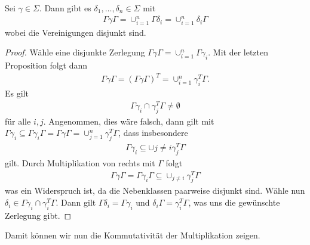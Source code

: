 
\begin{prop}
Sei $\gamma \in \Sigma$.
Dann gibt es $\delta_1,\dots,\delta_n\in \Sigma$ mit
\begin{align*}
\Gamma \gamma \Gamma =\cup_{i=1}^n \Gamma \delta_i=\cup_{i=1}^n \delta_i \Gamma
\end{align*}
wobei die Vereinigungen disjunkt sind.
\end{prop}
\begin{proof}
Wähle eine disjunkte Zerlegung $\Gamma \gamma \Gamma = \cup_{i=1}^n \Gamma \gamma_i$.
Mit der letzten Proposition folgt dann
\begin{align*}
\Gamma \gamma \Gamma=\left(\Gamma \gamma \Gamma\right)^T=\cup_{i=1}^n \gamma_i^T \Gamma.
\end{align*}
Es gilt
\begin{align*}
\Gamma \gamma_i \cap \gamma_j^T \Gamma \not =\emptyset
\end{align*}
für alle $i,j$.
Angenommen, dies wäre falsch, dann gilt mit $\Gamma \gamma_i \subseteq \Gamma \gamma_i \Gamma=\Gamma \gamma \Gamma=\cup_{j=1}^n \gamma_j^T \Gamma$, dass insbesondere
\begin{align*}
\Gamma \gamma_i \subseteq \cup{j\not =i} \gamma_j^T \Gamma
\end{align*}
gilt.
Durch Multiplikation von rechts mit $\Gamma$ folgt
\begin{align*}
\Gamma \gamma \Gamma =\Gamma \gamma_i \Gamma \subseteq \cup_{j\not =i} \gamma_j^T \Gamma
\end{align*}
was ein Widerspruch ist, da die Nebenklassen paarweise disjunkt sind.
Wähle nun $\delta_i \in \Gamma \gamma_i \cap \gamma_i^T \Gamma$.
Dann gilt $\Gamma \delta_i =\Gamma \gamma_i$ und $\delta_i \Gamma =\gamma_i^T \Gamma$,
was uns die gewünschte Zerlegung gibt.
\end{proof}

Damit können wir nun die Kommutativität der Multiplikation zeigen.

